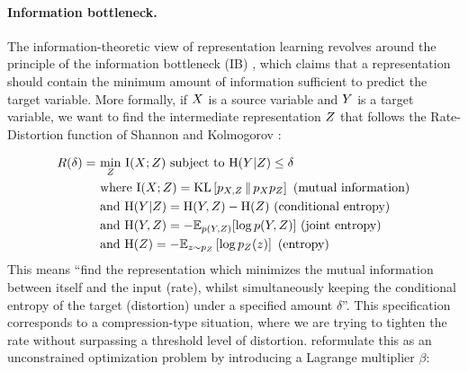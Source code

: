 \documentclass[../thesis.tex]{subfiles}
\begin{document}

\paragraph{Information bottleneck.} The information-theoretic view of representation learning revolves around the principle of the information bottleneck (IB) \citep{tishby2000information}, which claims that a representation should contain the minimum amount of information sufficient to predict the target variable. More formally, if $\myrv{x}$ is a source variable and $\myrv{y}$ is a target variable, we want to find the intermediate representation $\myrv{z}$ that follows the Rate-Distortion function of Shannon and Kolmogorov \citep{cover1999elements}:

\begin{align}
    R(\delta) = ~ &\underset{\myrv{z}}{\min} ~ \mylik{I}(\myrv{x}; \myrv{z}) ~ \text{subject to} ~ \mathrm{H}(\myrv{y} | \myrv{z}) \leq \delta \\
    &\text{where} ~ \mathrm{I}(\myrv{x}; \myrv{z}) = \mathrm{KL}\left[ \myfunc{p}_{\myrv{x}, \myrv{z}} \,\|\, \myfunc{p}_{\myrv{x}} \myfunc{p}_{\myrv{z}} \right] ~ \text{(mutual information)} \\
    &\text{and} ~ \mathrm{H}(\myrv{y} | \myrv{z}) = \mathrm{H}(\myrv{y}, \myrv{z}) - \mathrm{H}(\myrv{z}) ~ \text{(conditional entropy)} \\
    &\text{and} ~ \mathrm{H}(\myrv{y}, \myrv{z}) = - \mathbb{E}_{p(\myrv{y}, \myrv{z})} [\log p(\myrv{y}, \myrv{z})] ~ \text{(joint entropy)} \\
    &\text{and} ~ \mathrm{H}(\myrv{z}) = - \myexp{p}{\myvect{z}}{\myrv{z}} \left[ \log \myfunc{p}_{\myrv{z}} (\myvect{z}) \right] ~ \text{(entropy)}
\end{align}
This means ``find the representation which minimizes the mutual information between itself and the input (rate), whilst simultaneously keeping the conditional entropy of the target (distortion) under a specified amount $\delta$''. This specification corresponds to a compression-type situation, where we are trying to tighten the rate without surpassing a threshold level of distortion. \citet{tishby2000information} reformulate this as an unconstrained optimization problem by introducing a Lagrange multiplier $\beta$:
\end{document}
